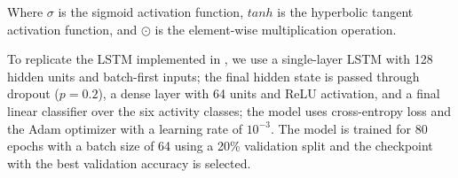 Where $\sigma$ is the sigmoid activation function, $tanh$ is the hyperbolic
tangent activation function, and $\odot$ is the element-wise multiplication operation.

To replicate the LSTM implemented in \cite{saha-2025},
we use a single-layer LSTM with 128 hidden units and batch-first inputs;
the final hidden state is passed through dropout ($p = 0.2$),
a dense layer with 64 units and ReLU activation,
and a final linear classifier over the six activity classes;
the model uses cross-entropy loss
and the Adam optimizer with a learning rate of $10^{-3}$.
The model is trained for 80 epochs with a batch size of 64 using a 20\% validation split
and the checkpoint with the best validation accuracy is selected.

%

%
%
%
%
%
